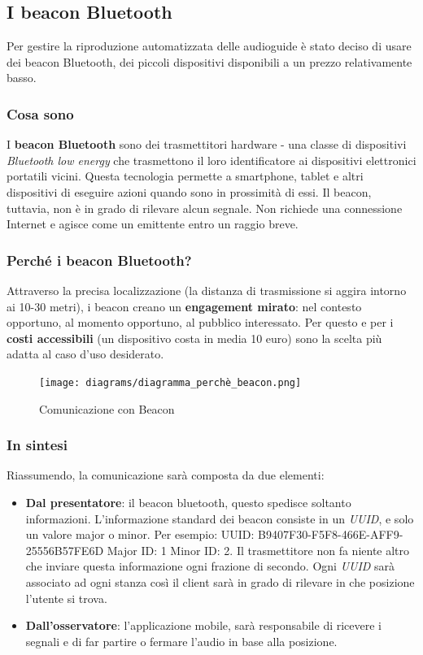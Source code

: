 \subsection{I beacon Bluetooth}
Per gestire la riproduzione automatizzata delle audioguide è stato deciso di usare dei beacon Bluetooth, dei piccoli dispositivi disponibili a un prezzo relativamente basso. 

\subsubsection{Cosa sono}
I \textbf{beacon Bluetooth} sono dei trasmettitori hardware - una classe di dispositivi \emph{Bluetooth low energy} che trasmettono il loro identificatore ai dispositivi elettronici portatili vicini. Questa tecnologia permette a smartphone, tablet e altri dispositivi di eseguire azioni quando sono in prossimità di essi. Il beacon, tuttavia, non è in grado di rilevare alcun segnale. Non richiede una connessione Internet e agisce come un emittente entro un raggio breve.\cite{what_are_beacons}


\subsubsection{Perché i beacon Bluetooth?}
Attraverso la precisa localizzazione (la distanza di trasmissione si aggira intorno ai 10-30 metri), i beacon creano un \textbf{engagement mirato}: nel contesto opportuno, al momento opportuno, al pubblico interessato. Per questo e per i \textbf{costi accessibili} (un dispositivo costa in media 10 euro) sono la scelta più adatta al caso d'uso desiderato.

\begin{center}
\begin{figure}[htp]
    \centering
    \texttt{[image: diagrams/diagramma\_perchè\_beacon.png]}
    \caption{Comunicazione con Beacon}
    \label{fig:comunicazione_beacon}
\end{figure}
\end{center}

\subsubsection{In sintesi}
Riassumendo, la comunicazione sarà composta da due elementi:
\begin{itemize}
    \item \textbf{Dal presentatore}: il beacon bluetooth, questo spedisce soltanto informazioni. L’informazione standard dei beacon consiste in un \emph{UUID}, e solo un valore major o minor. Per
    esempio: UUID: B9407F30-F5F8-466E-AFF9-25556B57FE6D Major ID: 1 Minor ID: 2. Il trasmettitore non fa niente altro che inviare questa informazione ogni frazione di secondo. Ogni \emph{UUID} sarà associato ad ogni stanza così il client sarà in grado di rilevare in che posizione l'utente si trova.
    \item \textbf{Dall'osservatore}: l'applicazione mobile, sarà responsabile di ricevere i segnali e di far partire o fermare l'audio in base alla posizione.
\end{itemize}

